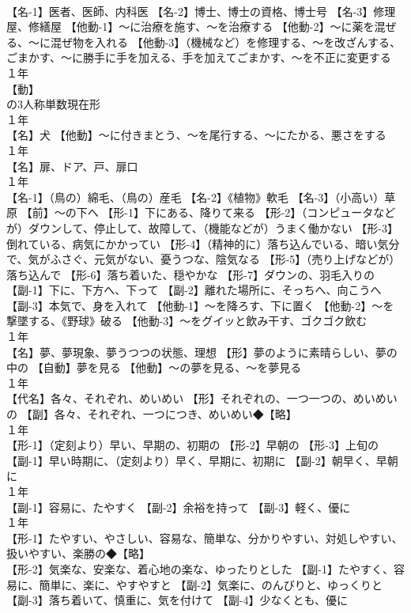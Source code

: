 \documentclass[8pt]{extreport}
\begin{document}
\begin{CJK}{UTF8}{min}
\\	【名-1】医者、医師、内科医 【名-2】博士、博士の資格、博士号 【名-3】修理屋、修繕屋 【他動-1】～に治療を施す、～を治療する 【他動-2】～に薬を混ぜる、～に混ぜ物を入れる 【他動-3】（機械など）を修理する、～を改ざんする、ごまかす、～に勝手に手を加える、手を加えてごまかす、～を不正に変更する
\\	１年	
\\	【動】
\\	の3人称単数現在形
\\	１年	
\\	【名】犬 【他動】～に付きまとう、～を尾行する、～にたかる、悪さをする
\\	１年	
\\	【名】扉、ドア、戸、扉口
\\	１年	
\\	【名-1】（鳥の）綿毛、（鳥の）産毛 【名-2】《植物》軟毛 【名-3】（小高い）草原 【前】～の下へ 【形-1】下にある、降りて来る 【形-2】（コンピュータなどが）ダウンして、停止して、故障して、（機能などが）うまく働かない 【形-3】倒れている、病気にかかってい 【形-4】（精神的に）落ち込んでいる、暗い気分で、気がふさぐ、元気がない、憂うつな、陰気なる 【形-5】（売り上げなどが）落ち込んで 【形-6】落ち着いた、穏やかな 【形-7】ダウンの、羽毛入りの 【副-1】下に、下方へ、下って 【副-2】離れた場所に、そっちへ、向こうへ 【副-3】本気で、身を入れて 【他動-1】～を降ろす、下に置く 【他動-2】～を撃墜する、《野球》破る 【他動-3】～をグイッと飲み干す、ゴクゴク飲む
\\	１年	
\\	【名】夢、夢現象、夢うつつの状態、理想 【形】夢のように素晴らしい、夢の中の 【自動】夢を見る 【他動】～の夢を見る、～を夢見る
\\	１年	
\\	【代名】各々、それぞれ、めいめい 【形】それぞれの、一つ一つの、めいめいの 【副】各々、それぞれ、一つにつき、めいめい◆【略】
\\	１年	
\\	【形-1】（定刻より）早い、早期の、初期の 【形-2】早朝の 【形-3】上旬の 【副-1】早い時期に、（定刻より）早く、早期に、初期に 【副-2】朝早く、早朝に
\\	１年	
\\	【副-1】容易に、たやすく 【副-2】余裕を持って 【副-3】軽く、優に
\\	１年	
\\	【形-1】たやすい、やさしい、容易な、簡単な、分かりやすい、対処しやすい、扱いやすい、楽勝の◆【略】
\\	【形-2】気楽な、安楽な、着心地の楽な、ゆったりとした 【副-1】たやすく、容易に、簡単に、楽に、やすやすと 【副-2】気楽に、のんびりと、ゆっくりと 【副-3】落ち着いて、慎重に、気を付けて 【副-4】少なくとも、優に

\end{CJK}
\end{document}
